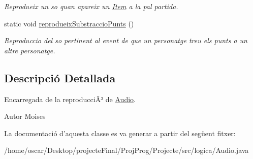 \begin{DoxyCompactItemize}
\begin{DoxyCompactList}\small\item\em Reprodueix un so quan apareix un \hyperlink{classlogica_1_1_item}{Item} a la pal partida. \end{DoxyCompactList}\item 
\hypertarget{classlogica_1_1_audio_ada3a781e4d6bb88233054514b439540d}{static void \hyperlink{classlogica_1_1_audio_ada3a781e4d6bb88233054514b439540d}{reprodueix\+Substraccio\+Punts} ()}\label{classlogica_1_1_audio_ada3a781e4d6bb88233054514b439540d}

\begin{DoxyCompactList}\small\item\em Reproduccio del so pertinent al event de que un personatge treu els punts a un altre personatge. \end{DoxyCompactList}\end{DoxyCompactItemize}


\subsection{Descripció Detallada}
Encarregada de la reproducciÃ³ de \hyperlink{classlogica_1_1_audio}{Audio}. 

\begin{DoxyAuthor}{Autor}
Moises 
\end{DoxyAuthor}


La documentació d'aquesta classe es va generar a partir del següent fitxer\+:\begin{DoxyCompactItemize}
\item 
/home/oscar/\+Desktop/projecte\+Final/\+Proj\+Prog/\+Projecte/src/logica/Audio.\+java\end{DoxyCompactItemize}
